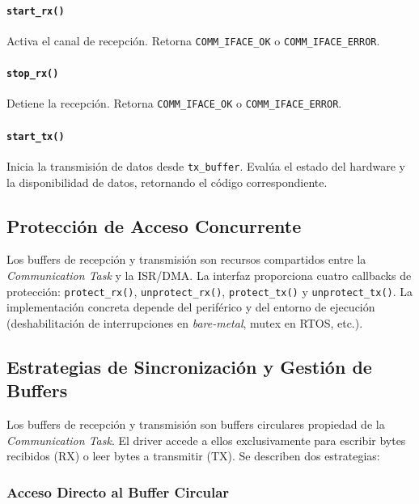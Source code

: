 \paragraph{\texttt{start\_rx()}} Activa el canal de recepción. Retorna
\texttt{COMM\_IFACE\_OK} o \texttt{COMM\_IFACE\_ERROR}.

\paragraph{\texttt{stop\_rx()}} Detiene la recepción. Retorna \texttt{COMM\_IFACE\_OK}
o \texttt{COMM\_IFACE\_ERROR}.

\paragraph{\texttt{start\_tx()}} Inicia la transmisión de datos desde
\texttt{tx\_buffer}. Evalúa el estado del hardware y la disponibilidad de datos, retornando el código correspondiente.

\subsection{Protección de Acceso Concurrente}
\label{subsec:proteccion-concurrente}

Los buffers de recepción y transmisión son recursos compartidos entre la \textit{Communication Task} y la ISR/DMA. La interfaz proporciona cuatro callbacks de protección: \texttt{protect\_rx()}, \texttt{unprotect\_rx()}, \texttt{protect\_tx()} y \texttt{unprotect\_tx()}. La implementación concreta depende del periférico y del entorno de ejecución (deshabilitación de interrupciones en \textit{bare-metal}, mutex en RTOS, etc.).

\subsection{Estrategias de Sincronización y Gestión de Buffers}
\label{subsec:driver-buffers}

Los buffers de recepción y transmisión son buffers circulares propiedad de la \textit{Communication Task}. El driver accede a ellos exclusivamente para escribir bytes recibidos (RX) o leer bytes a transmitir (TX). Se describen dos estrategias:

\subsubsection{Acceso Directo al Buffer Circular}

